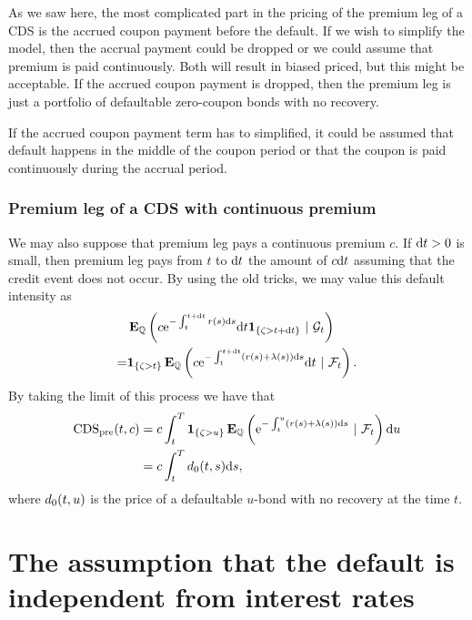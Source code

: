 As we saw here, the most complicated part in the pricing of the premium leg of a CDS is the accrued coupon payment before the default. If we wish to simplify the model, then the accrual payment could be dropped or we could assume that premium is paid continuously. Both will result in biased priced, but this might be acceptable. If the accrued coupon payment is dropped, then the premium leg is just a portfolio of defaultable zero-coupon bonds with no recovery.

If the accrued coupon payment term has to simplified, it could be assumed that default happens in the middle of the coupon period or that the coupon is paid continuously during the accrual period.

\subsubsection{Premium leg of a CDS with continuous premium}

We may also suppose that premium leg pays a continuous premium $c$. If $\mathrm{d} t > 0$ is small, then premium leg pays from $t$ to $\mathrm{d} t$ the amount of $c \mathrm{d} t$ assuming that the credit event does not occur. By using the old tricks, we may value this default intensity as
	\begin{align}
		&\operatorname{\boldsymbol{\mathrm{E}}}_{\mathbb{Q}} \left( c \mathrm{e}^{ - \int_t^{t+\mathrm{d} t} r(s) \mathrm{d} s} \mathrm{d} t \boldsymbol{1}_{ \{ \zeta > t + \mathrm{d} t	  \} } \ | \ \mathcal{G}_t \right) \\
		= &\boldsymbol{1}_{ \{ \zeta  > t \} } \operatorname{\boldsymbol{\mathrm{E}}}_{\mathbb{Q}} \left( c \mathrm{e}^{ - \int_t^{t+\mathrm{d} t} (r(s) + \lambda(s)) \mathrm{d} s} \mathrm{d} t \ | \ \mathcal{F}_t \right) .
	\end{align}
By taking the limit of this process we have that
	\begin{align}
		\operatorname{\mathrm{CDS_{pre}}}(t, c) &= c \int_t^T \boldsymbol{1}_{ \{ \zeta  > u \} } \operatorname{\boldsymbol{\mathrm{E}}}_{\mathbb{Q}} \left(  \mathrm{e}^{ - \int_t^{u} (r(s) + \lambda(s)) \mathrm{d} s} \ | \ \mathcal{F}_t \right) \mathrm{d} u \\
		&= c \int_t^T d_0(t,s) \mathrm{d} s ,
	\end{align}
where $d_0(t,u)$ is the price of a defaultable $u$-bond with no recovery at the time $t$.


\section{The assumption that the default is independent from interest rates}

